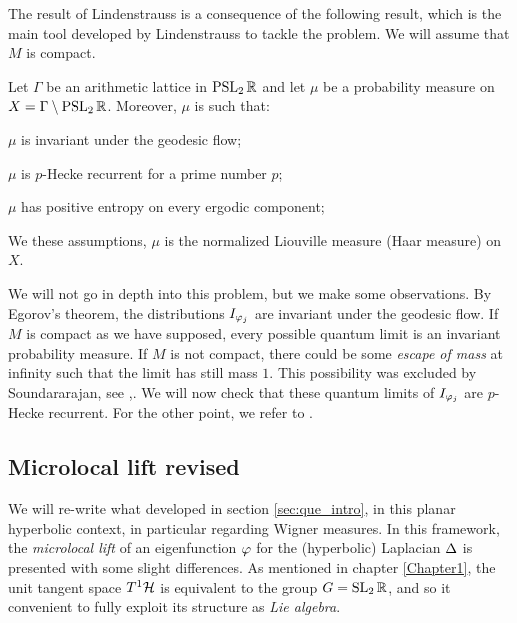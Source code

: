 The result of Lindenstrauss is a consequence of the following result, which is the main tool developed by Lindenstrauss to tackle the problem. We will assume that $M$ is compact. 

\begin{nteo}
Let $\Gamma$ be an arithmetic lattice in $\operatorname{PSL}_{2}\mathbb{R}$ and let $\mu$ be a probability measure on $X=\Gamma\setminus\operatorname{PSL}_{2}\mathbb{R}$. Moreover, $\mu$ is such that:
\begin{compactitem}
\item $\mu$ is invariant under the geodesic flow;
\item $\mu$ is $p$-Hecke recurrent for a prime number $p$;
\item $\mu$ has positive entropy on every ergodic component;
\end{compactitem}
We these assumptions, $\mu$ is the normalized Liouville measure (Haar measure) on $X$.
\end{nteo}

We will not go in depth into this problem, but we make some observations. By Egorov's theorem, the distributions $I_{\varphi_{j}}$ are invariant under the geodesic flow. If $M$ is compact as we have supposed, every possible quantum limit is an invariant probability measure. If $M$ is not compact, there could be some \emph{escape of mass} at infinity such that the limit has still mass $1$. This possibility was excluded by Soundararajan, see \cite{Sound:article},\cite{Sound:QUE_notes}. We will now check that these quantum limits of $I_{\varphi_{j}}$ are $p$-Hecke recurrent. For the other point, we refer to \cite{EinTW:AQUE}.



\subsection{Microlocal lift revised}


We will re-write what developed in section \ref{sec:que_intro}, in this planar hyperbolic context, in particular regarding Wigner measures. In this framework, the \emph{microlocal lift} of an eigenfunction $\varphi$ for the (hyperbolic) Laplacian $\operatorname{\Delta}$ is presented with some slight differences. As mentioned in chapter \ref{Chapter1}, the unit tangent space $T^{1}\mathcal{H}$ is equivalent to the group $G=\operatorname{SL}_{2}\mathbb{R}$, and so it convenient to fully exploit its structure as \emph{Lie algebra}.

